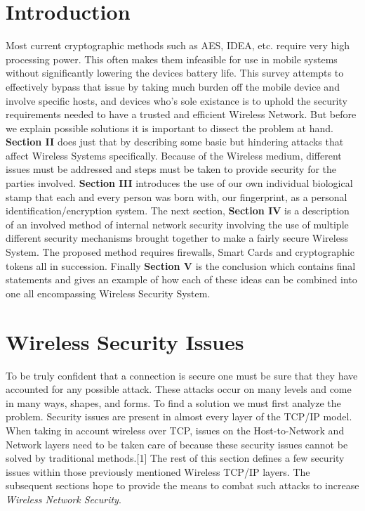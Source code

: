 \documentclass[11pt,onecolumn,cspaper,compsoc]{IEEEtran}
\begin{document}
\maketitle


\section{Introduction}

Most current cryptographic methods such as AES, IDEA, etc. require very high processing power. This often makes them infeasible for use in 
mobile systems without significantly lowering the devices battery life. This survey attempts to effectively bypass that issue by taking much
burden off the mobile device and involve specific hosts, and devices who's sole existance is to uphold the security requirements needed
to have a trusted and efficient Wireless Network. But before we explain possible solutions it is important to dissect the problem at hand. 
\textbf{Section II} does just that by describing some basic but hindering attacks that affect Wireless Systems specifically. Because of the Wireless 
medium, different issues must be addressed and steps must be taken to provide security for the parties involved. \textbf{Section III} introduces the 
use of our own individual biological stamp that each and every person was born with, our fingerprint, as a personal identification/encryption system. 
The next section, \textbf{Section IV} is a description of an involved method of internal network security involving the use of multiple different 
security mechanisms brought together to make a fairly secure Wireless System. The proposed method requires firewalls, Smart Cards and cryptographic 
tokens all in succession. Finally \textbf{Section V} is the conclusion which contains final statements and gives an example of how each of these 
ideas can be combined into one all encompassing Wireless Security System.

\section{Wireless Security Issues}

\indent To be truly confident that a connection is secure one must be sure that they have accounted for any possible attack. These attacks 
occur on many levels and come in many ways, shapes, and forms. To find a solution we must first analyze the problem. Security issues are present 
in almost every layer of the TCP/IP model. When taking in account wireless over TCP, issues on the Host-to-Network and Network layers need to be 
taken care of because these security issues cannot be solved by traditional methods.[1] The rest of this section defines a few security issues 
within those previously mentioned Wireless TCP/IP layers. The subsequent sections hope to provide the means to combat such attacks to increase 
\textit{Wireless Network Security}.
\end{document}
